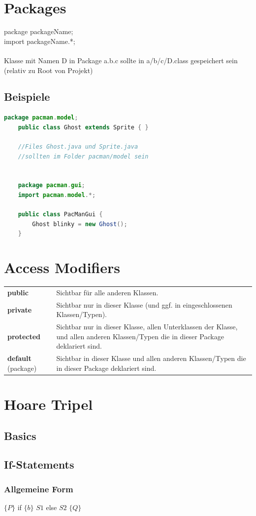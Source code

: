 \documentclass[12pt,a4paper]{article}
\begin{document}
\section{Packages}
package packageName;\\
import packageName.*;\\\\
Klasse mit Namen D in Package a.b.c sollte in a/b/c/D.class gespeichert sein (relativ zu Root von Projekt)
\subsection{Beispiele}
\begin{lstlisting}[language=Java]
	package pacman.model;
	public class Ghost extends Sprite { }

	//Files Ghost.java und Sprite.java
	//sollten im Folder pacman/model sein


	package pacman.gui;
	import pacman.model.*;

	public class PacManGui {
		Ghost blinky = new Ghost();
	}
\end{lstlisting}
\newpage
\section{Access Modifiers}
\begin{tabularx}{\linewidth}{ l X }
\textbf{public} & Sichtbar für alle anderen Klassen.\\
\textbf{private} & Sichtbar nur in dieser Klasse (und ggf. in eingeschlossenen Klassen/Typen).\\
\textbf{protected} & Sichtbar nur in dieser Klasse, allen Unterklassen der Klasse, und allen anderen Klassen/Typen die in dieser Package deklariert sind.\\
\textbf{default} (package) & Sichtbar in dieser Klasse und allen anderen Klassen/Typen die in dieser Package deklariert sind.
\end{tabularx}
\section{Hoare Tripel}
\subsection{Basics} %
\subsection{If-Statements}
\subsubsection{Allgemeine Form}
$\{P\}$ if $\{b\}$ $S1$ else $S2$ $\{Q\}$
\end{document}
